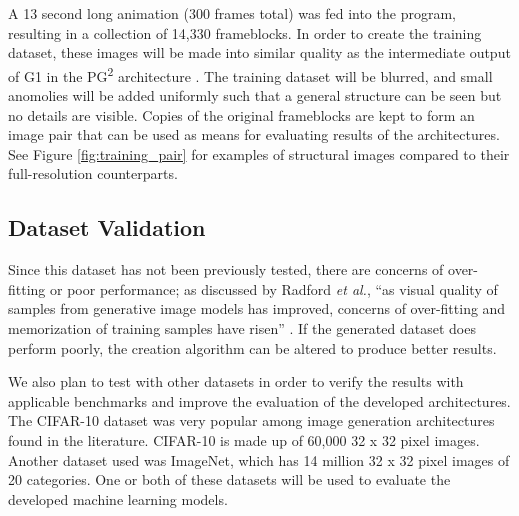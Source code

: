 \documentclass[letterpaper]{article} %
\begin{document}
A 13 second long animation (300 frames total) was fed into the program,
resulting in a collection of 14,330 frameblocks.
In order to create the training dataset, these images will be
made into similar quality
as the intermediate output of G1
in the PG\textsuperscript{2} architecture
\cite{pose_guided_image_generation}.
The training dataset will be blurred, and small anomolies will be added uniformly
such that a general structure can be seen but no details are visible.
Copies of the original frameblocks are kept to form an image pair that can be used
as means for evaluating results of the architectures.
See Figure \ref{fig:training_pair} for examples of structural images
compared to their full-resolution counterparts.

\subsection{Dataset Validation}
Since this dataset has not been previously tested, there are
concerns of over-fitting or poor performance; as discussed by Radford \textit{et al.},
``as visual quality of samples from generative image models has improved, concerns of
over-fitting and memorization of training samples have risen''
\cite{unsupervised_learning}.
If the generated dataset does perform poorly,
the creation algorithm can be altered to produce better results.

We also plan to test with other datasets in order to verify the results with applicable benchmarks
and improve the evaluation of the developed architectures.
The CIFAR-10 dataset was very popular among image generation architectures
found in the literature.
CIFAR-10 is made up of 60,000 32 x 32 pixel images.
Another dataset used was ImageNet, which has 14 million 32 x 32 pixel images of 20 categories.
One or both of these datasets will be used to evaluate the developed
machine learning models.
\end{document}
